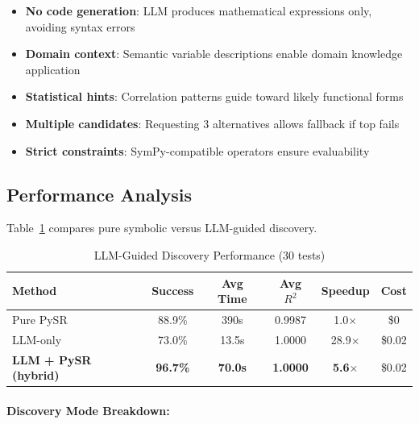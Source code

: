 \documentclass[twoside,11pt]{article}
\begin{document}
\begin{itemize}
\item \textbf{No code generation}: LLM produces mathematical expressions only, avoiding syntax errors\citep{kambhampati2024llms}
\item \textbf{Domain context}: Semantic variable descriptions enable domain knowledge application
\item \textbf{Statistical hints}: Correlation patterns guide toward likely functional forms
\item \textbf{Multiple candidates}: Requesting 3 alternatives allows fallback if top fails
\item \textbf{Strict constraints}: SymPy-compatible operators ensure evaluability
\end{itemize}

\subsection{Performance Analysis}

Table~\ref{tab:llm_hybrid_performance} compares pure symbolic versus LLM-guided discovery\citep{koza1994genetic}\citep{kambhampati2024llms}.

\begin{table}[htbp]
\centering
\caption{LLM-Guided Discovery Performance (30 tests)}
\label{tab:llm_hybrid_performance}
\begin{tabular}{@{}lccccc@{}}
\toprule
\textbf{Method} & \textbf{Success} & \textbf{Avg Time} & \textbf{Avg $R^2$} & \textbf{Speedup} & \textbf{Cost} \\
\midrule
Pure PySR & 88.9\% & 390s & 0.9987 & 1.0$\times$ & \$0 \\
LLM-only & 73.0\% & 13.5s & 1.0000 & 28.9$\times$ & \$0\citep{kambhampati2024llms}.02 \\
\textbf{LLM + PySR (hybrid)} & \textbf{96.7\%} & \textbf{70.0s} & \textbf{1.0000} & \textbf{5.6}$\times$ & \$0\citep{kambhampati2024llms}.02 \\
\bottomrule
\end{tabular}
\end{table}

\paragraph{Discovery Mode Breakdown:}\citep{koza1994genetic}
\end{document}
